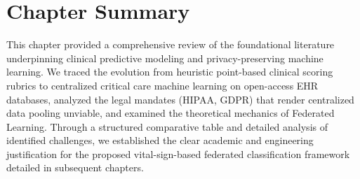 \section{Chapter Summary}
\label{sec:chapter2_summary}

This chapter provided a comprehensive review of the foundational literature underpinning clinical predictive modeling and privacy-preserving machine learning. We traced the evolution from heuristic point-based clinical scoring rubrics to centralized critical care machine learning on open-access EHR databases, analyzed the legal mandates (HIPAA, GDPR) that render centralized data pooling unviable, and examined the theoretical mechanics of Federated Learning. Through a structured comparative table and detailed analysis of identified challenges, we established the clear academic and engineering justification for the proposed vital-sign-based federated classification framework detailed in subsequent chapters.
